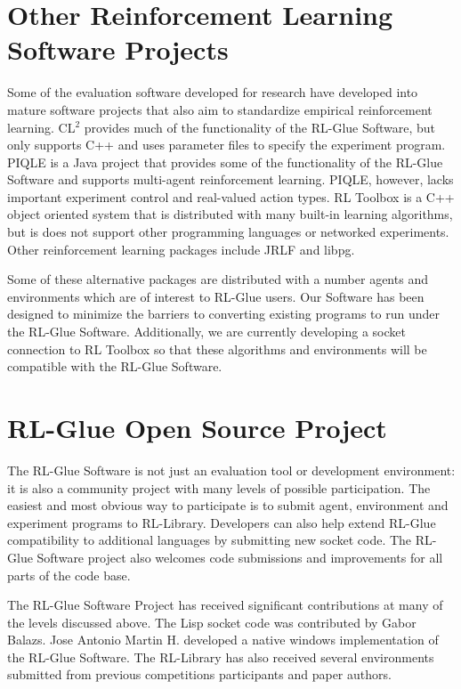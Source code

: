 \documentclass[twopage,11pt]{article}
\begin{document}
\section{Other Reinforcement Learning Software Projects}
Some of the evaluation software developed for research have developed into mature software projects that also aim to standardize empirical reinforcement learning. CL$^2$ provides much of the functionality of the RL-Glue Software, but only supports C++ and uses parameter files to specify the experiment program. PIQLE is a Java project that provides some of the functionality of the RL-Glue Software and supports multi-agent reinforcement learning. PIQLE, however, lacks important experiment control and real-valued action types. RL Toolbox is a C++ object oriented system that is distributed with many built-in learning algorithms, but is does not support other programming languages or networked experiments. Other reinforcement learning packages include JRLF and libpg. 

Some of these alternative packages are distributed with a number agents and environments which are of interest to RL-Glue users. Our Software has been designed to minimize the barriers to converting existing programs to run under the RL-Glue Software. Additionally, we are currently developing a socket connection to RL Toolbox so that these algorithms and environments will be compatible with the RL-Glue Software. 






 
 
 
\section{RL-Glue Open Source Project}

The RL-Glue Software is not just an evaluation tool or development environment: it is also a community project with many levels of possible participation. The easiest and most obvious way to participate is to submit agent, environment and experiment programs to RL-Library. Developers can also help extend RL-Glue compatibility to additional languages by submitting new socket code. The RL-Glue Software project also welcomes code submissions and improvements for all parts of the code base.   	

The RL-Glue Software Project has received significant contributions at many of the levels discussed above. The Lisp socket code was contributed by Gabor Balazs. Jose Antonio Martin H. developed a native windows implementation of the RL-Glue Software. The RL-Library has also received several environments submitted from previous competitions participants and paper authors.
\end{document}

